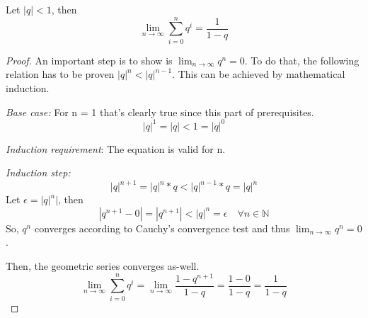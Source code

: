 \begin{lemma}
    Let $|q| < 1$, then
    \begin{equation}
        \lim_{n \to \infty}\sum_{i=0}^{n}q^i = \frac{1}{1-q}
    \end{equation}
\end{lemma}
\begin{proof}
    An important step is to show is $\lim_{n \to \infty}q^n = 0$.
    To do that, the following relation has to be proven $|q|^{n} < |q|^{n-1}$.
    This can be achieved by mathematical induction.

    \emph{Base case:} For n = 1 that's clearly true since this part of prerequisites.
    \begin{equation}
        |q|^1 = |q| < 1 = |q|^0
    \end{equation}

    \emph{Induction requirement}: The equation is valid for n.

    \emph{Induction step:} 
    \begin{equation}
        |q|^{n+1} = |q|^n * q < |q|^{n-1} * q = |q|^n 
    \end{equation}
    Let $\epsilon = |q|^n|$, then
    \begin{equation}
        |q^{n+1}-0| = |q^{n+1}| < |q|^n = \epsilon \quad \forall n \in \mathbb{N}
    \end{equation}
    So, $q^n$ converges according to Cauchy's convergence test and 
    thus $\lim_{n \to \infty}q^n = 0$.

    Then, the geometric series converges as-well.
    \begin{equation}
        \lim_{n \to \infty}\sum_{i=0}^{n}q^i = \lim_{n \to \infty}\frac{1-q^{n+1}}{1-q}
                                             = \frac{1-0}{1-q}
                                             = \frac{1}{1-q}
    \end{equation}
\end{proof}

